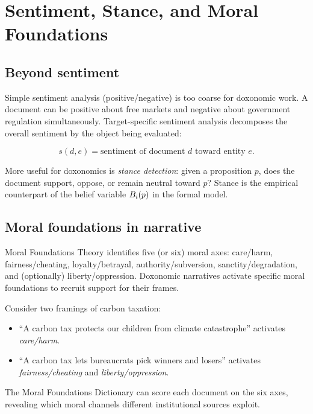 \section{Sentiment, Stance, and Moral Foundations}
\label{sec:ch17-sentiment}

\subsection{Beyond sentiment}

Simple sentiment analysis (positive/negative) is too coarse for doxonomic work.
A document can be positive about free markets and negative about government regulation simultaneously.
Target-specific sentiment analysis decomposes the overall sentiment by the object being evaluated:

\[
  s(d, e) = \text{sentiment of document } d \text{ toward entity } e.
\]

More useful for doxonomics is \emph{stance detection}: given a proposition $p$, does the document support, oppose, or remain neutral toward $p$?
Stance is the empirical counterpart of the belief variable $B_{i}(p)$ in the formal model.

\subsection{Moral foundations in narrative}

Moral Foundations Theory \autocite{haidt2012} identifies five (or six) moral axes: care/harm, fairness/cheating, loyalty/betrayal, authority/subversion, sanctity/degradation, and (optionally) liberty/oppression.
Doxonomic narratives activate specific moral foundations to recruit support for their frames.

\begin{example}
\label{ex:moral-foundations}
Consider two framings of carbon taxation:
\begin{itemize}[nosep]
  \item ``A carbon tax protects our children from climate catastrophe'' activates \emph{care/harm}.
  \item ``A carbon tax lets bureaucrats pick winners and losers'' activates \emph{fairness/cheating} and \emph{liberty/oppression}.
\end{itemize}
The Moral Foundations Dictionary \autocite{graham2009} can score each document on the six axes, revealing which moral channels different institutional sources exploit.
\end{example}

